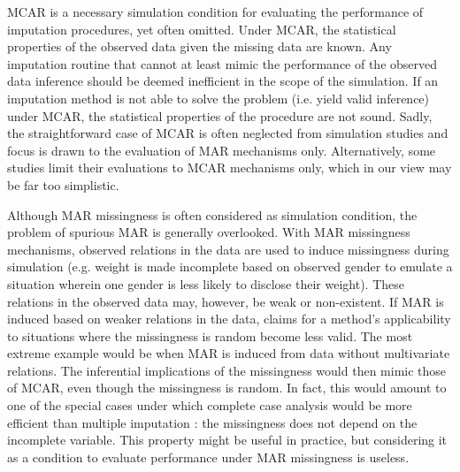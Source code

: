 \documentclass[bimj,fleqn]{w-art}
\begin{document}



MCAR is a necessary simulation condition for evaluating the performance of imputation procedures, yet often omitted. Under MCAR, the statistical properties of the observed data given the missing data are known. Any imputation routine that cannot at least mimic the performance of the observed data inference should be deemed inefficient in the scope of the simulation. If an imputation method is not able to solve the problem (i.e. yield valid inference) under MCAR, the statistical properties of the procedure are not sound. Sadly, the straightforward case of MCAR is often neglected from simulation studies and focus is drawn to the evaluation of MAR mechanisms only. Alternatively, some studies limit their evaluations to MCAR mechanisms only, which in our view may be far too simplistic. 

Although MAR missingness is often considered as simulation condition, the problem of spurious MAR is generally overlooked. With MAR missingness mechanisms, observed relations in the data are used to induce missingness during simulation (e.g. weight is made incomplete based on observed gender to emulate a situation wherein one gender is less likely to disclose their weight). These relations in the observed data may, however, be weak or non-existent. If MAR is induced based on weaker relations in the data, claims for a method's applicability to situations where the missingness is random become less valid. The most extreme example would be when MAR is induced from data without multivariate relations. The inferential implications of the missingness would then mimic those of MCAR, even though the missingness is random. In fact, this would amount to one of the special cases under which complete case analysis would be more efficient than multiple imputation \citep[see e.g.][p. 48]{fimd}: the missingness does not depend on the incomplete variable. This property might be useful in practice, but considering it as a condition to evaluate performance under MAR missingness is useless. 
\end{document}

